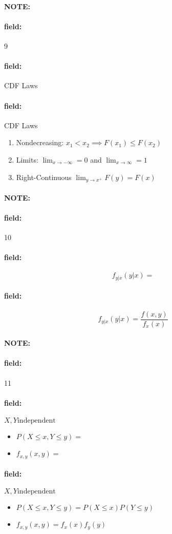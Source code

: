 \documentclass[12pt]{article}
\newenvironment{note}{\paragraph{NOTE:}}{}
\newenvironment{field}{\paragraph{field:}}{}
\begin{document}
\begin{note}
  \begin{field}
    \tiny 9
  \end{field}
  \begin{field}
    CDF Laws
  \end{field}
  \begin{field}
    CDF Laws
    \begin{enumerate}
      \item Nondecreasing: $x_1 < x_2 \implies F(x_1) \leq F(x_2)$
      \item Limits: $\lim_{x \to -\infty}=0$ and $\lim_{x\to \infty} = 1$
      \item Right-Continuous $\lim_{y \to x^+}F(y) = F(x)$
    \end{enumerate}
  \end{field}
\end{note}

\begin{note}
  \begin{field}
    \tiny 10
  \end{field}
  \begin{field}
    $$f_{y|x}(y|x) = $$
  \end{field}
  \begin{field}
    $$f_{y|x}(y|x) = \frac{f(x,y)}{f_x(x)}$$
  \end{field}
\end{note}

\begin{note}
  \begin{field}
    \tiny 11
  \end{field}
  \begin{field}
    $X,Y \text{independent}$
    \begin{itemize}
      \item $P(X \leq x, Y \leq y) = $
      \item $f_{x,y}(x,y) = $
    \end{itemize}
  \end{field}
  \begin{field}
    $X,Y \text{independent}$
    \begin{itemize}
      \item $P(X \leq x, Y \leq y) = P(X \leq x)P(Y \leq y)$
      \item $f_{x,y}(x,y) = f_x(x)f_y(y)$
    \end{itemize}
  \end{field}
\end{note}
\end{document}
